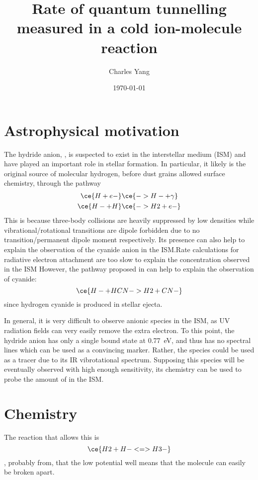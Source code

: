 \documentclass[12pt]{article}
\title{Rate of quantum tunnelling measured in a cold ion-molecule reaction}
\author{Charles Yang}
\date{\today}
\begin{document}
\maketitle
\section{Astrophysical motivation}
The hydride anion, , is suspected to exist in the interstellar medium (ISM) and have played an important role in stellar formation. In particular, it likely is the original source of molecular hydrogen, before dust grains allowed surface chemistry, through the pathway\cite{peebles_origin_1968}
\begin{subequations}
    \begin{align}
        \ce{H + e-}&\ce{-> H- + \gamma}\\
        \ce{H- + H}&\ce{-> H2 + e-}
    \end{align}
\end{subequations}
This is because three-body collisions are heavily suppressed by low densities while vibrational/rotational transitions are dipole forbidden due to no transition/permanent dipole moment respectively\cite{krumholz_notes_2016}.
Its presence can also help to explain the observation of the cyanide anion  in the ISM.\@ Rate calculations for radiative electron attachment are too slow to explain the concentration observed in the ISM\cite{douguet_theory_2013}
However, the pathway proposed in can help to explain the observation of cyanide:
\begin{equation}
    \ce{H- + HCN -> H2 + CN-}
\end{equation}
since hydrogen cyanide is produced in stellar ejecta\cite{tielens_molecular_2013}.

In general, it is very difficult to observe anionic species in the ISM, as UV radiation fields can very easily remove the extra electron. To this point, the hydride anion has only a single bound state at \SI{0.77}{eV}, and thus has no spectral lines which can be used as a convincing marker. Rather, the species  could be used as a tracer\cite{ayouz_formation_2011} due to its IR vibrotational spectrum. Supposing this species will be eventually observed with high enough sensitivity, its chemistry can be used to probe the amount of  in the ISM.\@

\section{Chemistry}
The reaction that allows this is 
\begin{equation}
    \ce{H2 + H- <=> H3-} \label{eq:h3}
\end{equation}
, probably from\cite{wang_observations_2003}, that the low potential well means that the molecule can easily be broken apart.
\end{document}
